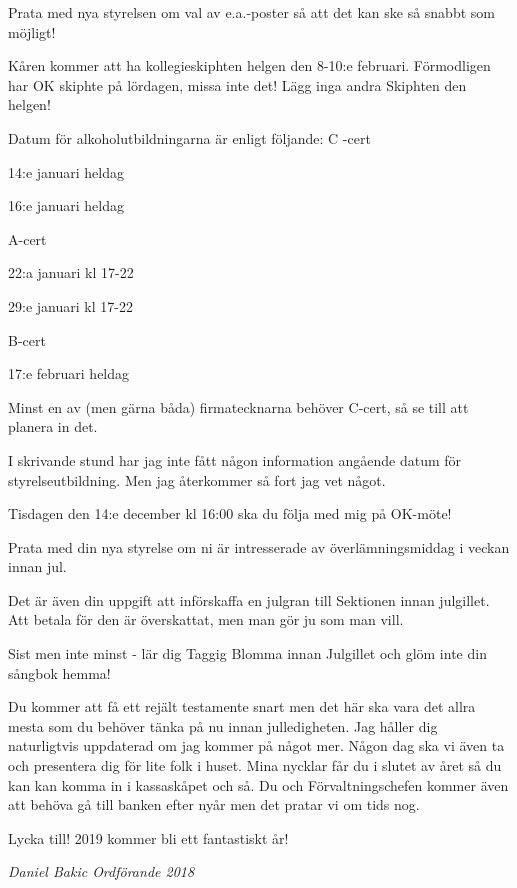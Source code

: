 \documentclass[10pt]{article}
\begin{document}
\begin{numplist}
    \item Prata med nya styrelsen om val av e.a.-poster så att det kan ske så snabbt som möjligt!
    
    \item Kåren kommer att ha kollegieskiphten helgen den 8-10:e februari. Förmodligen har OK skiphte på lördagen, missa inte det! Lägg inga andra Skiphten den helgen!
    
    \item Datum för alkoholutbildningarna är enligt följande: \newline
    C -cert
    \begin{dashlist}
        \item 14:e januari heldag
        \item 16:e januari heldag
    \end{dashlist}
    A-cert
    \begin{dashlist}
        \item 22:a januari kl 17-22
        \item 29:e januari kl 17-22 
    \end{dashlist}
    B-cert
    \begin{dashlist}
        \item 17:e februari heldag
    \end{dashlist}  
     Minst en av (men gärna båda) firmatecknarna behöver C-cert, så se till att planera in det.

    \item I skrivande stund har jag inte fått någon information angående datum för styrelseutbildning. Men jag återkommer så fort jag vet något.
    
    \item Tisdagen den 14:e december kl 16:00 ska du följa med mig på OK-möte!
    
    \item Prata med din nya styrelse om ni är intresserade av överlämningsmiddag i veckan innan jul.
    
    \item Det är även din uppgift att införskaffa en julgran till Sektionen innan julgillet. Att betala för den är överskattat, men man gör ju som man vill.
    
    \item Sist men inte minst - lär dig Taggig Blomma innan Julgillet och glöm inte din sångbok hemma!
    
    \end{numplist}
    
    Du kommer att få ett rejält testamente snart men det här ska vara det allra mesta som du behöver tänka på nu innan julledigheten. Jag håller dig naturligtvis uppdaterad om jag kommer på något mer. Någon dag ska vi även ta och presentera dig för lite folk i huset. Mina nycklar får du i slutet av året så du kan kan komma in i kassaskåpet och så. Du och Förvaltningschefen kommer även att behöva gå till banken efter nyår men det pratar vi om tids nog.
    
    Lycka till! 2019 kommer bli ett fantastiskt år!
    
    \emph{Daniel Bakic \newline Ordförande 2018}
    
    
\end{document}
